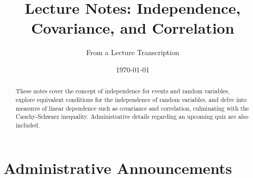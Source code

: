 \documentclass[11pt]{article}
\title{Lecture Notes: Independence, Covariance, and Correlation}
\author{From a Lecture Transcription}
\date{\today}
\begin{document}
\maketitle
\begin{abstract}
    These notes cover the concept of independence for events and random variables, explore equivalent conditions for the independence of random variables, and delve into measures of linear dependence such as covariance and correlation, culminating with the Cauchy-Schwarz inequality. Administrative details regarding an upcoming quiz are also included.
\end{abstract}

\tableofcontents

\newpage

\section*{Administrative Announcements}
\end{document}
